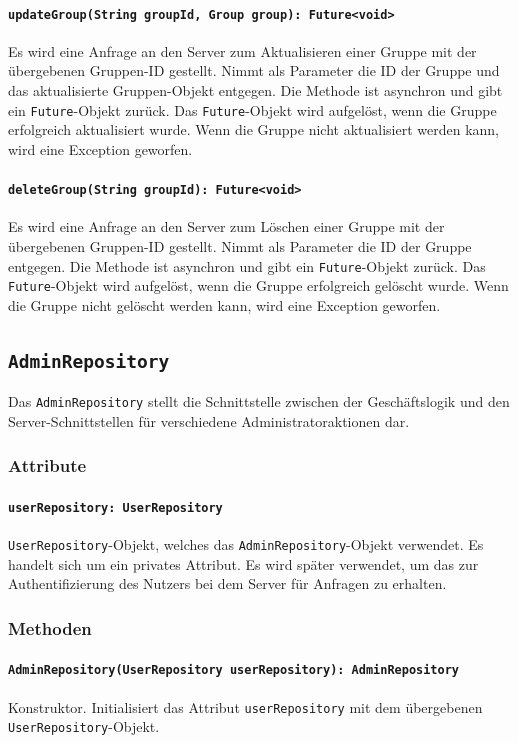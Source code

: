 \documentclass{entwurfsheft}
\begin{document}
\begin{sloppypar}
\paragraph{\texttt{updateGroup(String groupId, Group group): Future<void>}}
Es wird eine Anfrage an den Server zum Aktualisieren einer Gruppe mit der übergebenen Gruppen-ID gestellt. Nimmt als Parameter die ID der Gruppe und das aktualisierte Gruppen-Objekt entgegen. Die Methode ist asynchron und gibt ein \texttt{Future}-Objekt zurück. Das \texttt{Future}-Objekt wird aufgelöst, wenn die Gruppe erfolgreich aktualisiert wurde. Wenn die Gruppe nicht aktualisiert werden kann, wird eine Exception geworfen.
\paragraph{\texttt{deleteGroup(String groupId): Future<void>}}
Es wird eine Anfrage an den Server zum Löschen einer Gruppe mit der übergebenen Gruppen-ID gestellt. Nimmt als Parameter die ID der Gruppe entgegen. Die Methode ist asynchron und gibt ein \texttt{Future}-Objekt zurück. Das \texttt{Future}-Objekt wird aufgelöst, wenn die Gruppe erfolgreich gelöscht wurde. Wenn die Gruppe nicht gelöscht werden kann, wird eine Exception geworfen.
\newpage
\subsection{\texttt{AdminRepository}}
\label{sec:adminRepository}
Das \texttt{AdminRepository} stellt die Schnittstelle zwischen der Geschäftslogik und den Server-Schnittstellen für verschiedene Administratoraktionen dar.
\subsubsection*{Attribute}
\paragraph{\texttt{userRepository: UserRepository}}
\texttt{UserRepository}-Objekt, welches das \texttt{AdminRepository}-Objekt verwendet. Es handelt sich um ein privates Attribut. Es wird später verwendet, um das  zur Authentifizierung des Nutzers bei dem Server für Anfragen zu erhalten.
\subsubsection*{Methoden}
\paragraph{\texttt{AdminRepository(UserRepository userRepository): AdminRepository}}
Konstruktor. Initialisiert das Attribut \texttt{userRepository} mit dem übergebenen \texttt{UserRepository}-Objekt.

\end{sloppypar}
\end{document}
